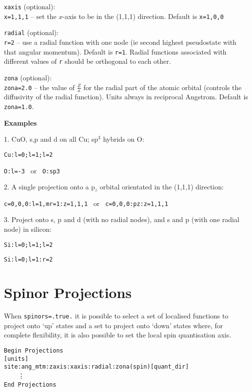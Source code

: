 \noindent
\verb#xaxis# (optional):\\
\verb#x=1,1,1#  --  set the $x$-axis to be in the (1,1,1) direction. Default is
\verb#x=1,0,0#

\noindent
\verb#radial# (optional):\\
\verb#r=2#      --  use a radial function with one node (ie second highest
pseudostate with that angular momentum). Default is
\verb#r=1#. Radial functions associated with different values of
\verb#r# should be orthogonal to each other. 

\noindent
\verb#zona# (optional):\\
\verb#zona=2.0# -- the value of $\frac{Z}{a}$ for the radial part of the
atomic orbital (controls the diffusivity of the radial
function). Units always in reciprocal Angstrom. Default is \verb#zona=1.0#.



\noindent
\textbf{Examples}

1. CuO, s,p and d on all Cu; sp$^3$ hybrids on O:

\verb#Cu:l=0;l=1;l=2 #

\verb#O:l=-3 #  or  \verb# O:sp3#

2. A single projection onto a p$_z$ orbital orientated in the (1,1,1)
 direction:

\verb#c=0,0,0:l=1,mr=1:z=1,1,1 # or \verb# c=0,0,0:pz:z=1,1,1#

3. Project onto s, p and d (with no radial nodes), and s and p (with one
   radial node) in silicon:

\verb#Si:l=0;l=1;l=2#

\verb#Si:l=0;l=1:r=2#

\section{Spinor Projections}
When \verb#spinors=.true.# it is possible to select a set of localised
functions to project onto `up' states and a set to project onto `down'
states where, for complete flexibility, it is also possible to set the
local spin quantisation axis.

\noindent
\verb#Begin Projections#\\
\verb#[units]#\\ 
\verb#site:ang_mtm:zaxis:xaxis:radial:zona(spin)[quant_dir]#\\
\verb#    #\vdots\\
\verb#End Projections#

